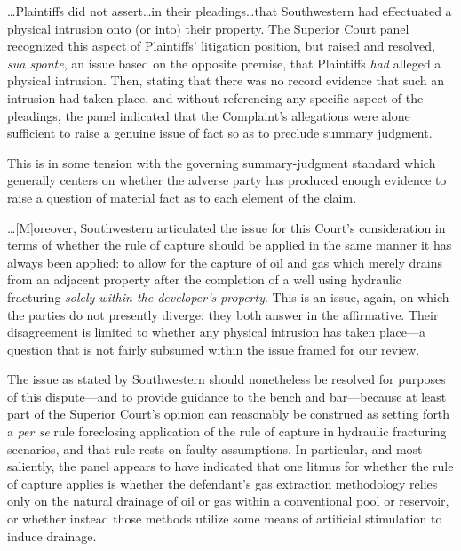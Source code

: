 
\ldots Plaintiffs did not assert\ldots in their pleadings\ldots that
Southwestern had effectuated a physical intrusion onto (or into) their property.
The Superior Court panel recognized this aspect of Plaintiffs' litigation
position, but raised and resolved, \textit{sua sponte}, an issue based on the
opposite premise, that Plaintiffs \textit{had} alleged a physical intrusion.
Then, stating that there was no record evidence that such an intrusion had taken
place, and without referencing any specific aspect of the pleadings, the panel
indicated that the Complaint's allegations were alone sufficient to raise a
genuine issue of fact so as to preclude summary judgment. 


This is in some tension with the governing summary-judgment standard which
generally centers on whether the adverse party has produced enough evidence to
raise a question of material fact as to each element of the claim. 

\ldots [M]oreover, Southwestern articulated the issue for this Court's
consideration in terms of whether the rule of capture should be applied in the
same manner it has always been applied: to allow for the capture of oil and gas
which merely drains from an adjacent property after the completion of a well
using hydraulic fracturing \textit{solely within the developer's property}. This
is an issue, again, on which the parties do not presently diverge: they both
answer in the affirmative. Their disagreement is limited to whether any physical
intrusion has taken place---a question that is not fairly subsumed within the
issue framed for our review.


The issue as stated by Southwestern should nonetheless be resolved for purposes
of this dispute---and to provide guidance to the bench and bar---because at
least part of the Superior Court's opinion can reasonably be construed as
setting forth a \textit{per se} rule foreclosing application of the rule of
capture in hydraulic fracturing scenarios, and that rule rests on faulty
assumptions. In particular, and most saliently, the panel appears to have
indicated that one litmus for whether the rule of capture applies is whether the
defendant's gas extraction methodology relies only on the natural drainage of
oil or gas within a conventional pool or reservoir, or whether instead those
methods utilize some means of artificial stimulation to induce drainage.



